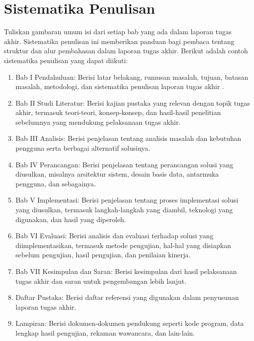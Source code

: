 \section{Sistematika Penulisan}
Tuliskan gambaran umum isi dari setiap bab yang ada dalam laporan tugas akhir. Sistematika penulisan ini memberikan panduan bagi pembaca tentang struktur dan alur pembahasan dalam laporan tugas akhir. Berikut adalah contoh sistematika penulisan yang dapat diikuti:
\begin{enumerate}
\item	Bab I Pendahuluan: Berisi latar belakang, rumusan masalah, tujuan, batasan masalah, metodologi, dan sistematika penulisan laporan tugas akhir       .
\item	Bab II Studi Literatur: Berisi kajian pustaka yang relevan dengan topik tugas akhir, termasuk teori-teori, konsep-konsep, dan hasil-hasil penelitian sebelumnya yang                mendukung pelaksanaan tugas akhir.
\item	Bab III Analisis: Berisi penjelasan tentang analisis masalah dan kebutuhan pengguna serta berbagai alternatif solusinya.
\item   Bab IV Perancangan: Berisi penjelasan tentang perancangan solusi yang diusulkan, misalnya arsitektur sistem, desain basis data, antarmuka pengguna, dan sebagainya.
\item	Bab V Implementasi: Berisi penjelasan tentang proses implementasi solusi yang diusulkan, termasuk langkah-langkah yang diambil, teknologi yang digunakan, dan hasil yang diperoleh.
\item	Bab VI Evaluasi: Berisi analisis dan evaluasi terhadap solusi yang diimplementasikan, termasuk metode pengujian, hal-hal yang disiapkan sebelum pengujian, hasil pengujian, dan penilaian kinerja.                  
\item   Bab VII Kesimpulan dan Saran: Berisi kesimpulan dari hasil pelaksanaan tugas akhir dan saran untuk pengembangan lebih lanjut.
\item   Daftar Pustaka: Berisi daftar referensi yang digunakan dalam penyusunan laporan tugas akhir.
\item   Lampiran: Berisi dokumen-dokumen pendukung seperti kode program, data lengkap hasil pengujian, rekaman wawancara, dan lain-lain. 
\end{enumerate}